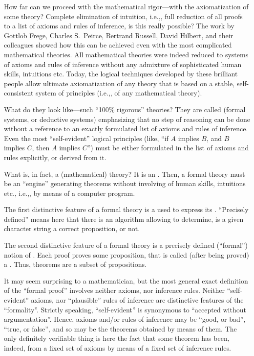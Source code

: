 How far can we proceed with the mathematical rigor---with the axiomatization of some theory?
Complete elimination of intuition, i.e.,, full reduction of all proofs to a list of axioms and rules of inference, is this really possible?
The work by Gottlob Frege, Charles S.\ Peirce, Bertrand Russell, David Hilbert, and their colleagues showed how this can be achieved even with the most complicated mathematical theories.
All mathematical theories were indeed reduced to systems of axioms and rules of inference without any admixture of sophisticated human skills, intuitions etc.
Today, the logical techniques developed by these brilliant people allow ultimate axiomatization of any theory that is based on a stable, self-consistent system of principles (i.e.,, of any mathematical theory).

What do they look like---such ``100\% rigorous'' theories?
They are called  (formal systems, or deductive systems) emphasizing that no step of reasoning can be done without a reference to an exactly formulated list of axioms and rules of inference.
Even the most ``self-evident'' logical principles (like, ``if \(A\) implies \(B\), and \(B\) implies \(C\), then \(A\) implies \(C\)'') must be either formulated in the list of axioms and rules explicitly, or derived from it.

What is, in fact, a (mathematical) theory?
It is an .
Then, a formal theory must be an ``engine'' generating theorems without involving of human skills, intuitions etc., i.e.,, by means of a computer program.

The first distinctive feature of a formal theory is a  used to express its .
``Precisely defined'' means here that there is an algorithm allowing to determine, is a given character string a correct proposition, or not.

The second distinctive feature of a formal theory is a precisely defined (``formal'') notion of .
Each proof proves some proposition, that is called (after being proved) a .
Thus, theorems are a subset of propositions.

It may seem surprising to a mathematician, but the most general exact definition of the ``formal proof'' involves neither axioms, nor inference rules.
Neither ``self-evident'' axioms, nor ``plausible'' rules of inference are distinctive features of the ``formality''.
Strictly speaking, ``self-evident'' is synonymous to ``accepted without argumentation''.
Hence, axioms and/or rules of inference may be ``good, or bad'', ``true, or false'', and so may be the theorems obtained by means of them.
The only definitely verifiable thing is here the fact that some theorem has been, indeed,  from a fixed set of axioms by means of a fixed set of inference rules.

